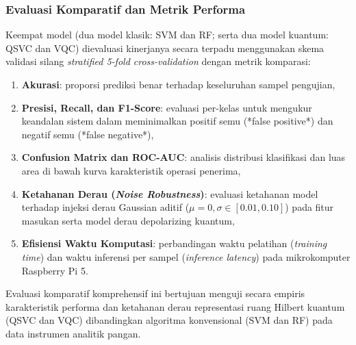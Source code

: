 \subsubsection{Evaluasi Komparatif dan Metrik Performa}
Keempat model (dua model klasik: SVM dan RF; serta dua model kuantum: QSVC dan VQC) dievaluasi kinerjanya secara terpadu menggunakan skema validasi silang \textit{stratified 5-fold cross-validation} dengan metrik komparasi:
\begin{enumerate}
    \item \textbf{Akurasi}: proporsi prediksi benar terhadap keseluruhan sampel pengujian,
    \item \textbf{Presisi, Recall, dan F1-Score}: evaluasi per-kelas untuk mengukur keandalan sistem dalam meminimalkan positif semu (*false positive*) dan negatif semu (*false negative*),
    \item \textbf{Confusion Matrix dan ROC-AUC}: analisis distribusi klasifikasi dan luas area di bawah kurva karakteristik operasi penerima,
    \item \textbf{Ketahanan Derau (\textit{Noise Robustness})}: evaluasi ketahanan model terhadap injeksi derau Gaussian aditif ($\mu = 0, \sigma \in [0.01, 0.10]$) pada fitur masukan serta model derau depolarizing kuantum,
    \item \textbf{Efisiensi Waktu Komputasi}: perbandingan waktu pelatihan (\textit{training time}) dan waktu inferensi per sampel (\textit{inference latency}) pada mikrokomputer Raspberry Pi 5.
\end{enumerate}
Evaluasi komparatif komprehensif ini bertujuan menguji secara empiris karakteristik performa dan ketahanan derau representasi ruang Hilbert kuantum (QSVC dan VQC) dibandingkan algoritma konvensional (SVM dan RF) pada data instrumen analitik pangan.

